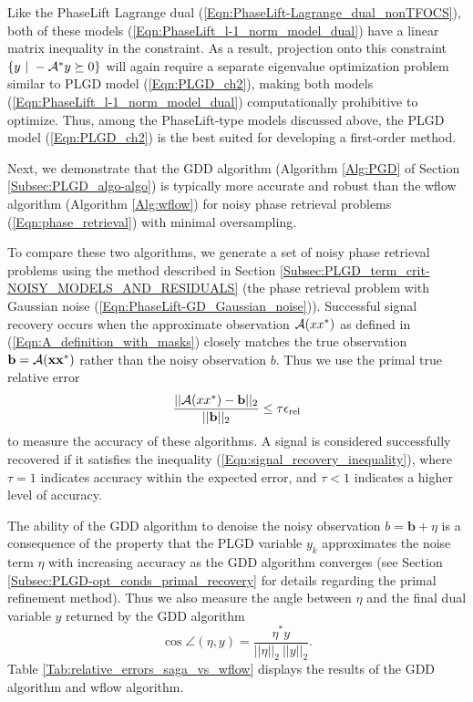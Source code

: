 Like the PhaseLift Lagrange dual (\ref{Eqn:PhaseLift-Lagrange_dual_nonTFOCS}), 
both of these models (\ref{Eqn:PhaseLift_l-1_norm_model_dual}) have a linear matrix inequality in the constraint.
As a result, projection onto this constraint $\{ y \ | \ -\caA^*y \succeq 0 \}$ will again require a separate eigenvalue optimization problem similar to PLGD model (\ref{Eqn:PLGD_ch2}), making both models (\ref{Eqn:PhaseLift_l-1_norm_model_dual}) computationally prohibitive to optimize.
Thus, among the PhaseLift-type models discussed above, the PLGD model (\ref{Eqn:PLGD_ch2}) is the best suited for developing a first-order method.







Next, we demonstrate that the GDD algorithm (Algorithm \ref{Alg:PGD} of Section \ref{Subsec:PLGD_algo-algo}) is typically more accurate and robust than the wflow algorithm (Algorithm \ref{Alg:wflow}) for noisy phase retrieval problems (\ref{Eqn:phase_retrieval}) with minimal oversampling.


To compare these two algorithms, we generate a set of noisy phase retrieval problems using the method described in Section \ref{Subsec:PLGD_term_crit-NOISY_MODELS_AND_RESIDUALS} (the phase retrieval problem with Gaussian noise (\ref{Eqn:PhaseLift-GD_Gaussian_noise})).
Successful signal recovery occurs when the approximate observation ${\mathcal A}(xx^*)$ as defined in (\ref{Eqn:A_definition_with_masks}) closely matches the true observation $\mathbf{b} = {\mathcal A}(\mathbf{x}\mathbf{x}^*)$ rather than the noisy observation $b$.  
Thus we use the primal true relative error 
\begin{equation} 	\label{Eqn:signal_recovery_inequality}
\frac{||{\mathcal A}(xx^*)-\mathbf{b}||_2}{ ||\mathbf{b}||_2 } \leq \tau \epsilon_{\textnormal{rel}}
\end{equation}
to measure the accuracy of these algorithms.  
A signal is considered successfully recovered if it satisfies the inequality (\ref{Eqn:signal_recovery_inequality}), where $\tau = 1$ indicates accuracy within the expected error, and $\tau < 1$ indicates a higher level of accuracy.  



The ability of the GDD algorithm to denoise the noisy observation $b = \mathbf{b} + \eta$ is a consequence of the property that the PLGD variable $y_k$ approximates the noise term $\eta$ with increasing accuracy as the GDD algorithm converges (see Section \ref{Subsec:PLGD-opt_conds_primal_recovery} for details regarding the primal refinement method).
Thus we also measure the angle between $\eta$ and the final dual variable $y$ returned by the GDD algorithm
\begin{equation} 			\label{Eqn:angle_eta_y}
	\cos \angle (\eta, y)	=	\frac{\eta^*y}{||\eta||_2 \ ||y||_2}.
\end{equation}
Table \ref{Tab:relative_errors_saga_vs_wflow} displays the results of the GDD algorithm and wflow algorithm.



